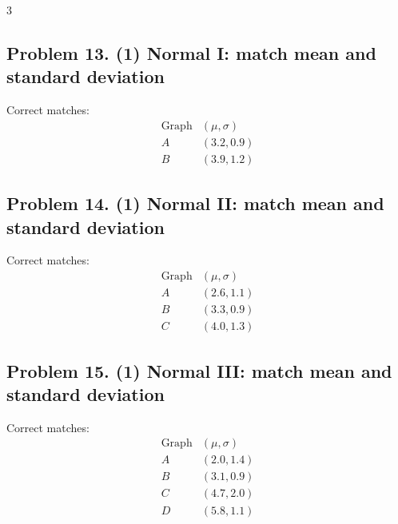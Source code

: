 \begin{multicols}{3}
\subsection*{Problem 13. (1) Normal I: match mean and standard deviation}
Correct matches:
\[
\begin{array}{c|c}
\text{Graph} & (\mu,\sigma) \\
\hline
A & (3.2,0.9) \\
B & (3.9,1.2)
\end{array}
\]

\subsection*{Problem 14. (1) Normal II: match mean and standard deviation}
Correct matches:
\[
\begin{array}{c|c}
\text{Graph} & (\mu,\sigma) \\
\hline
A & (2.6,1.1) \\
B & (3.3,0.9) \\
C & (4.0,1.3)
\end{array}
\]

\subsection*{Problem 15. (1) Normal III: match mean and standard deviation}
Correct matches:
\[
\begin{array}{c|c}
\text{Graph} & (\mu,\sigma) \\
\hline
A & (2.0,1.4) \\
B & (3.1,0.9) \\
C & (4.7,2.0) \\
D & (5.8,1.1)
\end{array}
\]

\end{multicols}

